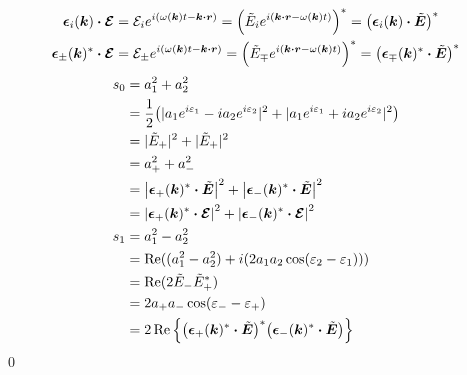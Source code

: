\documentclass[uplatex,dvipdfmx,a4paper,11pt]{jlreq}
\makeatletter
\newcommand{\rr}{\bm{r}}
\newcommand{\kk}{\bm{k}}
\theoremstyle{definition}
\renewenvironment{proof}[1][\proofname]{\par
  \normalfont
  \topsep6\p@\@plus6\p@ \trivlist
  \item[\hskip\labelsep{\bfseries #1}\@addpunct{\bfseries}]\ignorespaces\quad\par
}{%
  \qed\endtrivlist\@endpefalse
}
\renewcommand\proofname{証明}
\makeatother
\begin{document}
\begin{proof}
  \begin{align}
    \ee_i(\kk)\vdot\EC
     & = \Ec_ie^{\ii(\omega(\kk)t - \kk\vdot\rr)} = \qty(\Et_i e^{\ii(\kk\vdot\rr - \omega(\kk)t)})^* = \qty(\ee_i(\kk)\vdot\ET)^* \label{EC ET converter 12}          \\
    \ee_\pm(\kk)^*\vdot\EC
     & = \Ec_\pm e^{\ii(\omega(\kk)t - \kk\vdot\rr)} = \qty(\Et_\mp e^{\ii(\kk\vdot\rr - \omega(\kk)t)})^* = \qty(\ee_\mp(\kk)^*\vdot\ET)^* \label{EC ET converter +-}
  \end{align}
  \begin{align}
    s_0 & = a_1^2 + a_2^2                                                                                                                          \\
        & = \frac{1}{2}\qty(|a_1e^{\ii\varepsilon_1} - \ii a_2e^{\ii\varepsilon_2}|^2 + |a_1e^{\ii\varepsilon_1} + \ii a_2e^{\ii\varepsilon_2}|^2) \\
        & = |\tilde{E}_+|^2 + |\tilde{E}_+|^2                                                                                                      \\
        & = a_+^2 + a_-^2                                                                                                                          \\
        & = \qty|\ee_+(\kk)^*\vdot\ET|^2 + \qty|\ee_-(\kk)^*\vdot\ET|^2                                                                            \\
        & = \qty|\ee_+(\kk)^*\vdot\EC|^2 + \qty|\ee_-(\kk)^*\vdot\EC|^2                                                                            \\
    s_1 & = a_1^2 - a_2^2                                                                                                                          \\
        & = \Re((a_1^2 - a_2^2) + \ii(2a_1a_2\cos(\varepsilon_2 - \varepsilon_1)))                                                                 \\
        & = \Re(2\tilde{E}_-\tilde{E}_+^*)                                                                                                         \\
        & = 2a_+a_-\cos(\varepsilon_- - \varepsilon_+)                                                                                             \\
        & = 2\Re\qty{\qty(\ee_+(\kk)^*\vdot\ET)^*\qty(\ee_-(\kk)^*\vdot\ET)}                                                                       \\

\end{align}
\end{proof}
\end{document}
